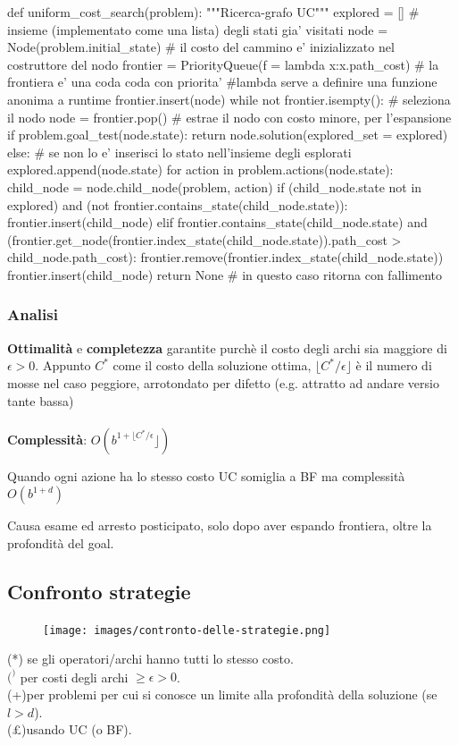 \begin{python}
	def uniform_cost_search(problem): """Ricerca-grafo UC"""
		explored = [] # insieme (implementato come una lista) degli stati gia' visitati
		node = Node(problem.initial_state) # il costo del cammino e' inizializzato nel costruttore del nodo
		frontier = PriorityQueue(f = lambda x:x.path_cost) # la frontiera e' una coda coda con priorita'
		#lambda serve a definire una funzione anonima a runtime
		frontier.insert(node)
		while not frontier.isempty():
			# seleziona il nodo node = frontier.pop() # estrae il nodo con costo minore, per l'espansione
			if problem.goal_test(node.state):
				return node.solution(explored_set = explored)
			else: # se non lo e' inserisci lo stato nell'insieme degli esplorati
			explored.append(node.state)
				for action in problem.actions(node.state):
			child_node = node.child_node(problem, action)
			if (child_node.state not in explored) and (not frontier.contains_state(child_node.state)):
				frontier.insert(child_node)
			elif frontier.contains_state(child_node.state) and 
				 (frontier.get_node(frontier.index_state(child_node.state)).path_cost > child_node.path_cost):
				frontier.remove(frontier.index_state(child_node.state))
				frontier.insert(child_node)
		return None # in questo caso ritorna con fallimento
\end{python}

\subsubsection{Analisi}
\textbf{Ottimalità} e \textbf{completezza} garantite purchè il costo degli archi sia maggiore di $\epsilon > 0$.
Appunto $C^*$ come il costo della soluzione ottima, $\lfloor C^*/\epsilon \rfloor$ è il numero 
di mosse nel caso peggiore, arrotondato per difetto (e.g. attratto ad andare versio tante bassa)\\\\
\textbf{Complessità}: $O(b^{1+\lfloor C^*/\epsilon}\rfloor)$
\begin{note}
	Quando ogni azione ha lo stesso costo UC somiglia a BF ma complessità $O(b^{1+d})$
\end{note}
\hspace{-15pt}Causa esame ed arresto posticipato, solo dopo aver espando frontiera, oltre la profondità del goal.

\subsection{Confronto strategie}
\begin{figure}[h!]
	\centering
	\texttt{[image: images/contronto-delle-strategie.png]}
\end{figure}

\hspace{-15pt}(*) se gli operatori/archi hanno tutti lo stesso costo.\\
$(^)$ per costi degli archi $\geq \epsilon > 0$.\\
(+)per problemi per cui si conosce un limite alla profondità della soluzione (se $l>d$).\\
(£)usando UC (o BF).